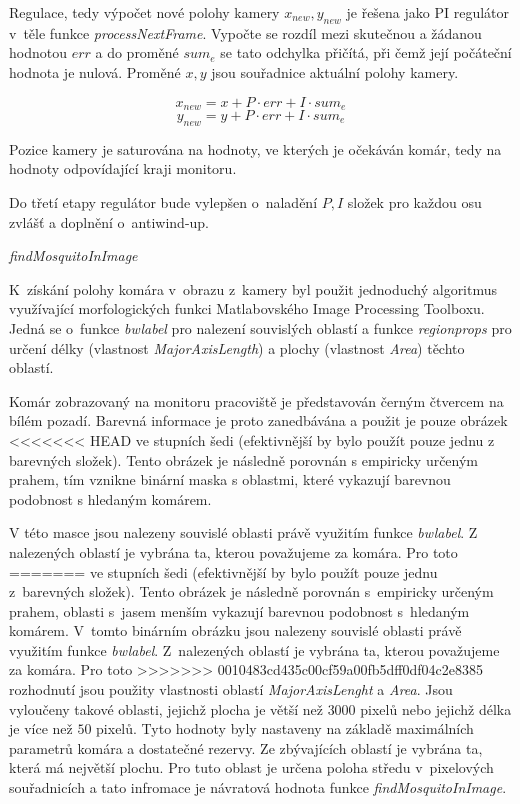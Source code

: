 \documentclass[a4paper,10pt]{article}
\begin{document}
	        Regulace, tedy výpočet nové polohy kamery $x_{new}, y_{new}$ je řešena jako PI
		regulátor v~těle funkce \textit{processNextFrame}. 
	        Vypočte se rozdíl mezi skutečnou a žádanou hodnotou $err$ a do
		proměné $sum_e$ se tato odchylka přičítá, při čemž její počáteční hodnota je
		nulová. Proměné $x, y$ jsou souřadnice aktuální polohy kamery.

		$$x_{new} = x + P\cdot err + I\cdot sum_e$$
		$$y_{new} = y + P\cdot err + I\cdot sum_e$$

		Pozice kamery je saturována na hodnoty, ve
		kterých je očekáván komár, tedy na hodnoty odpovídající kraji monitoru.

		Do třetí etapy regulátor bude vylepšen o~naladění $P, I$ složek pro každou osu
		zvlášť a doplnění o~antiwind-up. 

		\vspace{0.5cm}
		\textit{findMosquitoInImage}

		K~získání polohy komára v~obrazu z~kamery byl použit jednoduchý algoritmus
		využívající morfologických funkci Matlabovského Image Processing Toolboxu. Jedná
		se o~funkce \textit{bwlabel} pro nalezení souvislých oblastí a funkce
		\textit{regionprops} pro určení délky (vlastnost \textit{MajorAxisLength}) a
		plochy (vlastnost \textit{Area}) těchto oblastí.


		Komár zobrazovaný na monitoru pracoviště je představován černým čtver\-cem na
		bílém pozadí. Barevná informace je proto zanedbávána a použit je pouze obrázek
<<<<<<< HEAD
		ve stupních šedi (efektivnější by bylo použít pouze jednu z barevných složek).
		Tento obrázek je následně porovnán s empiricky určeným prahem, tím vznikne binární maska s oblastmi, 
		které vykazují barevnou podobnost s hledaným komárem. 
	    
		V této masce
		jsou nalezeny souvislé oblasti právě využitím funkce \textit{bwlabel}. Z
		nalezených oblastí je vybrána ta, kterou považujeme za komára. Pro toto
=======
		ve stupních šedi (efektivnější by bylo použít pouze jednu z~barevných složek).
		Tento obrázek je následně porovnán s~empiricky určeným prahem, oblasti s~jasem
		menším vykazují barevnou podobnost s~hledaným komárem. V~tomto binárním obrázku
		jsou nalezeny souvislé oblasti právě využitím funkce \textit{bwlabel}.
Z~nalezených oblastí je vybrána ta, kterou považujeme za komára. Pro toto
>>>>>>> 0010483cd435c00cf59a00fb5dff0df04c2e8385
		rozhodnutí jsou použity vlastnosti oblastí \textit{MajorAxisLenght} a
		\textit{Area}. Jsou vyloučeny takové oblasti, jejichž plocha je větší než $3000$
		pixelů nebo jejichž délka je více než $50$ pixelů. Tyto hodnoty byly nastaveny
		na základě maximálních parametrů komára a dostatečné rezervy. Ze zbývajících
		oblastí je vybrána ta, která má největší plochu. Pro tuto oblast je určena
		poloha středu v~pixelových souřadnicích a tato infromace je návratová hodnota
		funkce \textit{findMosquitoInImage}.
\end{document}
